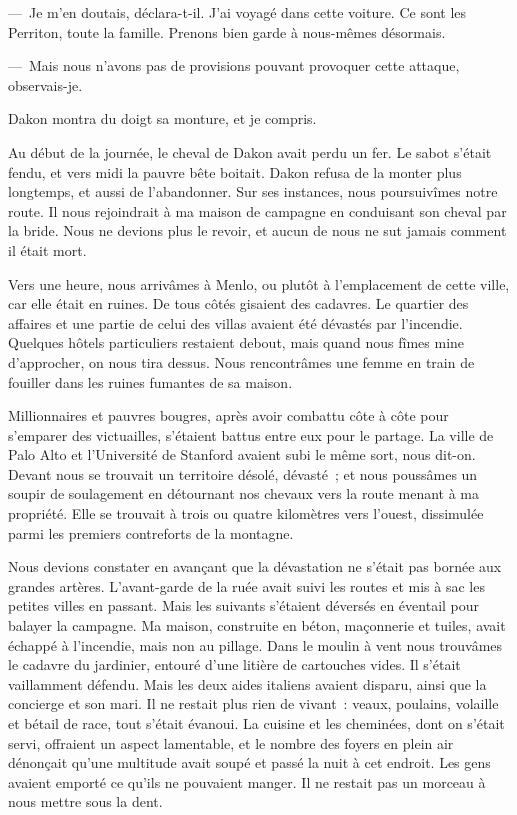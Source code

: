 \documentclass[french,twoside]{book} %
\begin{document}
— Je m’en doutais, déclara-t-il. J’ai voyagé dans cette voiture. Ce sont les Perriton, toute la famille. Prenons bien garde à nous-mêmes désormais.\par
— Mais nous n’avons pas de provisions pouvant provoquer cette attaque, observais-je.\par
Dakon montra du doigt sa monture, et je compris.\par
Au début de la journée, le cheval de Dakon avait perdu un fer. Le sabot s’était fendu, et vers midi la pauvre bête boitait. Dakon refusa de la monter plus longtemps, et aussi de l’abandonner. Sur ses instances, nous poursuivîmes notre route. Il nous rejoindrait à ma maison de campagne en conduisant son cheval par la bride. Nous ne devions plus le revoir, et aucun de nous ne sut jamais comment il était mort.\par
Vers une heure, nous arrivâmes à Menlo, ou plutôt à l’emplacement de cette ville, car elle était en ruines. De tous côtés gisaient des cadavres. Le quartier des affaires et une partie de celui des villas avaient été dévastés par l’incendie. Quelques hôtels particuliers restaient debout, mais quand nous fîmes mine d’approcher, on nous tira dessus. Nous rencontrâmes une femme en train de fouiller dans les ruines fumantes de sa maison.\par
Millionnaires et pauvres bougres, après avoir combattu côte à côte pour s’emparer des victuailles, s’étaient battus entre eux pour le partage. La ville de Palo Alto et l’Université de Stanford avaient subi le même sort, nous dit-on. Devant nous se trouvait un territoire désolé, dévasté ; et nous poussâmes un soupir de soulagement en détournant nos chevaux vers la route menant à ma propriété. Elle se trouvait à trois ou quatre kilomètres vers l’ouest, dissimulée parmi les premiers contreforts de la montagne.\par
Nous devions constater en avançant que la dévastation ne s’était pas bornée aux grandes artères. L’avant-garde de la ruée avait suivi les routes et mis à sac les petites villes en passant. Mais les suivants s’étaient déversés en éventail pour balayer la campagne. Ma maison, construite en béton, maçonnerie et tuiles, avait échappé à l’incendie, mais non au pillage. Dans le moulin à vent nous trouvâmes le cadavre du jardinier, entouré d’une litière de cartouches vides. Il s’était vaillamment défendu. Mais les deux aides italiens avaient disparu, ainsi que la concierge et son mari. Il ne restait plus rien de vivant : veaux, poulains, volaille et bétail de race, tout s’était évanoui. La cuisine et les cheminées, dont on s’était servi, offraient un aspect lamentable, et le nombre des foyers en plein air dénonçait qu’une multitude avait soupé et passé la nuit à cet endroit. Les gens avaient emporté ce qu’ils ne pouvaient manger. Il ne restait pas un morceau à nous mettre sous la dent.\par
\end{document}
